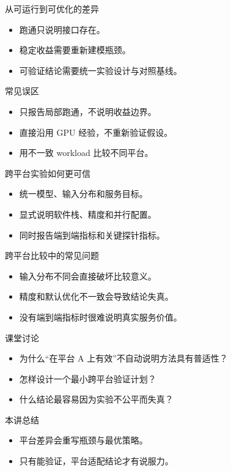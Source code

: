 \begin{frame}{从可运行到可优化的差异}
  \begin{itemize}
    \item 跑通只说明接口存在。
    \item 稳定收益需要重新建模瓶颈。
    \item 可验证结论需要统一实验设计与对照基线。
  \end{itemize}
\end{frame}

\begin{frame}{常见误区}
  \begin{itemize}
    \item 只报告局部跑通，不说明收益边界。
    \item 直接沿用 GPU 经验，不重新验证假设。
    \item 用不一致 workload 比较不同平台。
  \end{itemize}
\end{frame}

\begin{frame}{跨平台实验如何更可信}
  \begin{itemize}
    \item 统一模型、输入分布和服务目标。
    \item 显式说明软件栈、精度和并行配置。
    \item 同时报告端到端指标和关键探针指标。
  \end{itemize}
\end{frame}

\begin{frame}{跨平台比较中的常见问题}
  \begin{itemize}
    \item 输入分布不同会直接破坏比较意义。
    \item 精度和默认优化不一致会导致结论失真。
    \item 没有端到端指标时很难说明真实服务价值。
  \end{itemize}
\end{frame}



\begin{frame}{课堂讨论}
  \begin{itemize}
    \item 为什么“在平台 A 上有效”不自动说明方法具有普适性？
    \item 怎样设计一个最小跨平台验证计划？
    \item 什么结论最容易因为实验不公平而失真？
  \end{itemize}
\end{frame}

\begin{frame}{本讲总结}
  \begin{itemize}
    \item 平台差异会重写瓶颈与最优策略。
    \item 只有能验证，平台适配结论才有说服力。
  \end{itemize}
\end{frame}

